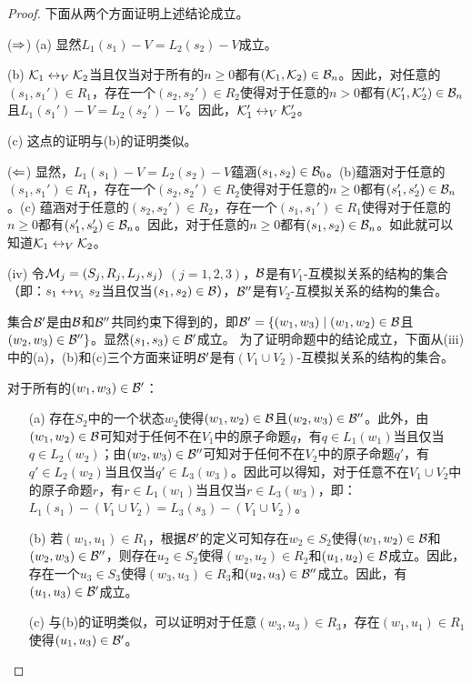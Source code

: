 \begin{proof}
	下面从两个方面证明上述结论成立。
	
	($\Rightarrow$) (a) 显然$L_1(s_1)-V = L_2(s_2)-V$成立。
	
	(b) ${\cal K}_1 \leftrightarrow_V {\cal K}_2$当且仅当对于所有的$n\ge 0$都有$({\cal K}_1, {\cal K}_2)\in {\cal B}_n$。因此，对任意的$(s_1,s_1')\in R_1$，存在一个$(s_2,s_2')\in R_2$使得对于任意的$n >0$都有$({\cal K}_1', {\cal K}_2') \in {\cal B}_n$且$L_1(s_1')-V=L_2(s_2')-V$。因此，${\cal K}_1' \leftrightarrow_V {\cal K}_2'$。
	
	(c) 这点的证明与(b)的证明类似。
	
	($\Leftarrow$) 显然，$L_1(s_1)-V = L_2(s_2)-V$蕴涵$(s_1,s_2)\in {\cal B}_0$。(b)蕴涵对于任意的$(s_1,s_1')\in R_1$，存在一个$(s_2,s_2')\in R_2$使得对于任意的$n\ge 0$都有$(s_1',s_2')\in {\cal B}_n$。(c) 蕴涵对于任意的$(s_2,s_2')\in R_2$，存在一个$(s_1,s_1')\in R_1$使得对于任意的$n\ge 0$都有$(s_1',s_2')\in {\cal B}_n$。因此，对于任意的$n\ge 0$都有$(s_1,s_2)\in {\cal B}_n$。如此就可以知道${\cal K}_1\leftrightarrow_V {\cal K}_2$。
	
	(iv) 令${\cal M}_j=(S_j,R_j,L_j,s_j)$ $(j=1,2,3)$，${\cal B}$是有$V_1$-互模拟关系的结构的集合（即：$s_1 \leftrightarrow_{V_1} s_2$当且仅当$(s_1,s_2)\in {\cal B}$），${\cal B}''$是有$V_2$-互模拟关系的结构的集合。
	
	集合${\cal B}'$是由${\cal B}$和${\cal B}''$共同约束下得到的，即${\cal B}'=\{(w_1, w_3)\mid (w_1, w_2)\in {\cal B}$且$(w_2,w_3)\in {\cal B}''\}$。显然$(s_1,s_3)\in {\cal B}'$成立。
	为了证明命题中的结论成立，下面从(iii)中的(a)，(b)和(c)三个方面来证明${\cal B}'$是有$(V_1\cup V_2)$-互模拟关系的结构的集合。
	
	对于所有的$(w_1,w_3)\in {\cal B}'$：
	\begin{itemize}
		\item[(a)] 存在$S_2$中的一个状态$w_2$使得$(w_1,w_2)\in {\cal B}$且$(w_2, w_3)\in {\cal B}''$。此外，由$(w_1, w_2)\in {\cal B}$可知对于任何不在$V_1$中的原子命题$q$，有$q\in L_1(w_1)$当且仅当$q\in L_2(w_2)$；由$(w_2, w_3)\in {\cal B}''$可知对于任何不在$V_2$中的原子命题$q'$，有$q'\in L_2(w_2)$当且仅当$q'\in L_3(w_3)$。因此可以得知，对于任意不在$V_1\cup V_2$中的原子命题$r$，有$r\in L_1(w_1)$当且仅当$r\in L_3(w_3)$，即：$L_1(s_1)-(V_1\cup V_2) = L_3(s_3)-(V_1 \cup V_2)$。
		\item[(b)] 若$(w_1, u_1)\in R_1$，根据${\cal B}'$的定义可知存在$w_2\in S_2$使得$(w_1,w_2)\in {\cal B}$和$(w_2,w_3)\in {\cal B}''$，则存在$u_2\in S_2$使得$(w_2, u_2)\in R_2$和$(u_1,u_2)\in {\cal B}$成立。因此，存在一个$u_3\in S_3$使得$(w_3,u_3)\in R_3$和$(u_2,u_3)\in{\cal B}''$成立。因此，有$(u_1,u_3)\in {\cal B}'$成立。
		\item[(c)] 与(b)的证明类似，可以证明对于任意$(w_3,u_3)\in R_3$，存在$(w_1,u_1)\in R_1$使得$(u_1,u_3)\in {\cal B}'$。
	\end{itemize}


\end{proof}
